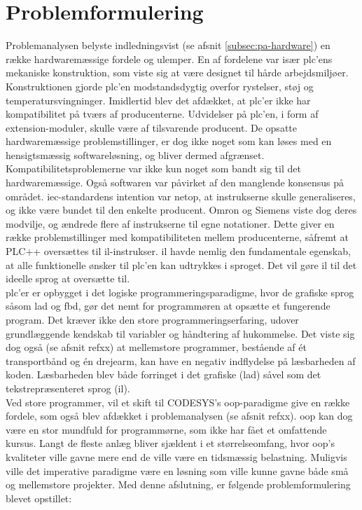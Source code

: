 \section{Problemformulering}
Problemanalysen belyste indledningsvist (se afsnit \ref{subsec:pa-hardware}) en række hardwaremæssige fordele og ulemper. En af fordelene var især \gls{plc}'ens mekaniske konstruktion, som viste sig at være designet til hårde arbejdsmiljøer. Konstruktionen gjorde \gls{plc}’en modstandsdygtig overfor rystelser, støj og temperatursvingninger. Imidlertid blev det afdækket, at \gls{plc}’er ikke har kompatibilitet på tværs af producenterne. Udvidelser på \gls{plc}’en, i form af extension-moduler, skulle være af tilsvarende producent. De opsatte hardwaremæssige problemstillinger, er dog ikke noget som kan løses med en hensigtsmæssig softwareløsning, og bliver dermed afgrænset. \\ 

\noindent Kompatibilitetsproblemerne var ikke kun noget som bandt sig til det hardwaremæssige. Også softwaren var påvirket af den manglende konsensus på området. \gls{iec}-standardens intention var netop, at instrukserne skulle generaliseres, og ikke være bundet til den enkelte producent. Omron og Siemens viste dog deres modvilje, og ændrede flere af instrukserne til egne notationer. Dette giver en række problemstillinger med kompatibiliteten mellem producenterne, såfremt at PLC++ oversættes til \gls{il}-instrukser. \gls{il} havde nemlig den fundamentale egenskab, at alle funktionelle ønsker til \gls{plc}’en kan udtrykkes i sproget. Det vil gøre \gls{il} til det ideelle sprog at oversætte til. \\

\noindent \gls{plc}'er er opbygget i det logiske programmeringsparadigme, hvor de grafiske sprog såsom \gls{lad} og \gls{fbd}, gør det nemt for programmøren at opsætte et fungerende program. Det kræver ikke den store programmeringserfaring, udover grundlæggende kendskab til variabler og håndtering af hukommelse. Det viste sig dog også (se afsnit refxx) at mellemstore programmer, bestående af ét transportbånd og én drejearm, kan have en negativ indflydelse på læsbarheden af koden. Læsbarheden blev både forringet i det grafiske (\gls{lad}) såvel som det tekstrepræsenteret sprog (\gls{il}). \\

\noindent Ved store programmer, vil et skift til CODESYS’s \gls{oop}-paradigme give en række fordele, som også blev afdækket i problemanalysen (se afsnit refxx). \gls{oop} kan dog være en stor mundfuld for programmørne, som ikke har fået et omfattende kursus. Langt de fleste anlæg bliver sjældent i et størrelseomfang, hvor \gls{oop}’s kvaliteter ville gavne mere end de ville være en tidsmæssig belastning. Muligvis ville det imperative paradigme være en løsning som ville kunne gavne både små og mellemstore projekter. Med denne afslutning, er følgende problemformulering blevet opstillet: \\

